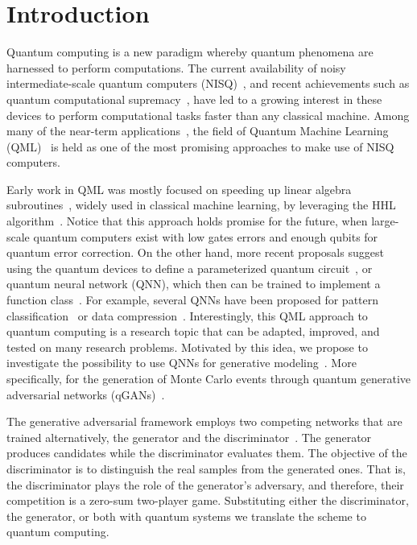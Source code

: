 \documentclass[twocolumn,preprintnumbers,superscriptaddress]{revtex4-2}
\begin{document}
\section{Introduction}

Quantum computing is a new paradigm whereby quantum phenomena are harnessed to
perform computations. The current availability of noisy intermediate-scale
quantum computers (NISQ)~\cite{nisq}, and recent achievements such as quantum
computational supremacy~\cite{supremacy, zhong2020quantum}, have led to a
growing interest in these devices to perform computational tasks faster than any
classical machine. Among many of the near-term
applications~\cite{cerezo2021variational, bharti2021noisy}, the field of Quantum
Machine Learning (QML)~\cite{biamonte2017quantum, schuld2018supervised} is held
as one of the most promising approaches to make use of NISQ computers.

Early work in QML was mostly focused on speeding up linear algebra
subroutines~\cite{wiebe2012quantum, lloyd:2013ml, Rebentrost:2014svm,
kerenidis2020quantum}, widely used in classical machine learning, by leveraging
the HHL algorithm~\cite{harrow2009quantum}. Notice that this approach holds
promise for the future, when large-scale quantum computers exist with low gates
errors and enough qubits for quantum error correction. On the other hand, more
recent proposals suggest using the quantum devices to define a parameterized
quantum circuit~\cite{benedetti2019parameterized, sim2019expressibility,
bravo2020scaling}, or quantum neural network (QNN), which then can be trained to
implement a function class~\cite{schuld2021effect, goto2021universal,
perez2021one}. For example, several QNNs have been proposed for pattern
classification~\cite{havlivcek2019supervised, Schuld:2020circuit,
perezsalinas:2020reuploading} or data compression~\cite{romero2017quantum,
bravo2021quantum, cao2021noise}. Interestingly, this QML approach to quantum
computing is a research topic that can be adapted, improved, and tested on many
research problems. Motivated by this idea, we propose to investigate the
possibility to use QNNs for generative modeling~\cite{benedetti2019generative,
hamilton2019generative, coyle2020born}. More specifically, for the generation of
Monte Carlo events through quantum generative adversarial networks
(qGANs)~\cite{dallaire2018quantum, lloyd2018quantum}.

The generative adversarial framework employs two competing networks that are
trained alternatively, the generator and the
discriminator~\cite{goodfellow2014generative}. The generator produces candidates
while the discriminator evaluates them. The objective of the discriminator is to
distinguish the real samples from the generated ones. That is, the discriminator
plays the role of the generator's adversary, and therefore, their competition is
a zero-sum two-player game. Substituting either the discriminator, the
generator, or both with quantum systems we translate the scheme to quantum
computing.
\end{document}
